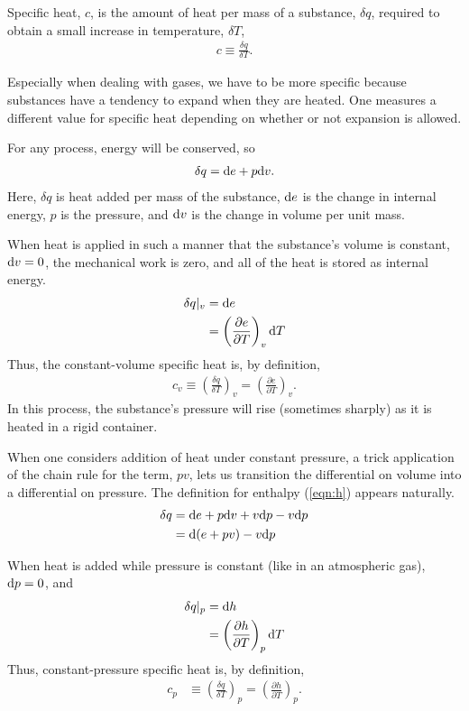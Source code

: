 Specific heat, $c$, is the amount of heat per mass of a substance, $\delta q$, required to obtain a small increase in temperature, $\delta T$,
\begin{align}
c \equiv \frac{\delta q}{\delta T}.
\end{align}

Especially when dealing with gases, we have to be more specific because substances have a tendency to expand when they are heated.  One measures a different value for specific heat depending on whether or not expansion is allowed. 

For any process, energy will be conserved, so
\begin{align}
\delta q = \mathrm{d} e + p\mathrm{d} v.\label{eqn:intro:1stlaw}
\end{align}
Here, $\delta q$ is heat added per mass of the substance, $\mathrm{d} e$ is the change in internal energy, $p$ is the pressure, and $\mathrm{d} v$ is the change in volume per unit mass.

When heat is applied in such a manner that the substance's volume is constant, $\mathrm{d} v = 0$, the mechanical work is zero, and all of the heat is stored as internal energy.
\begin{align}
\delta q |_v &= \mathrm{d} e\nonumber\\
 &= \left(\frac{\partial e}{\partial T}\right)_v \mathrm{d} T
\end{align}
Thus, the constant-volume specific heat is, by definition, 
\begin{align}
c_v \equiv \left(\frac{\delta q}{\delta T}\right)_v = \left(\frac{\partial e}{\partial T}\right)_v.\label{eqn:cv}
\end{align}
In this process, the substance's pressure will rise (sometimes sharply) as it is heated in a rigid container.

When one considers addition of heat under constant pressure, a trick application of the chain rule for the term, $pv$, lets us transition the differential on volume into a differential on pressure.  The definition for enthalpy (\ref{eqn:h}) appears naturally.
\begin{align}
\delta q &= \mathrm{d} e + p \mathrm{d} v + v\mathrm{d} p - v \mathrm{d} p\nonumber\\
 &= \mathrm{d}(e + pv) - v\mathrm{d} p
\end{align}

When heat is added while pressure is constant (like in an atmospheric gas), $\mathrm{d} p=0$, and 
\begin{align}
\delta q |_p &= \mathrm{d} h\nonumber\\
 &= \left( \frac{\partial h}{\partial T}\right)_p \mathrm{d} T
\end{align}
Thus, constant-pressure specific heat is, by definition,
\begin{align}
c_p &\equiv \left(\frac{\delta q}{\delta T}\right)_p = \left( \frac{\partial h}{\partial T}\right)_p.\label{eqn:cp}
\end{align}



%
% 
%
